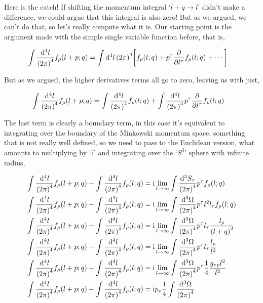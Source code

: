 Here is the catch! If shifting the momentum integral `$l+q\rightarrow l$' didn't make a difference, we could 
argue that this integral is also zero! But as we argued, we can't do that, so let's really compute what it is. 
Our starting point is the argument made with the simple single variable function before, that is,

\begin{align}
    \int\frac{\dd[4]{l}}{\qty(2\pi)^4}f_\rho\qty(l+p;q)&=\int\dd[4]{l}{\qty(2\pi)^4}\qty[f_\rho\qty(l;q)+p^\tau\pdv{}{l^\tau}f_\rho\qty(l;q)+\cdots]\nonumber
\end{align}

But as we argued, the higher derivatives terms all go to zero, leaving us with just,

\begin{align}
    \int\frac{\dd[4]{l}}{\qty(2\pi)^4}f_\rho\qty(l+p;q)&=\int\frac{\dd[4]{l}}{\qty(2\pi)^4}f_\rho\qty(l;q)+\int\frac{\dd[4]{l}}{\qty(2\pi)^4}p^\tau\pdv{}{l^\tau}f_\rho\qty(l;q)\nonumber
\end{align}

The last term is clearly a boundary term, in this case it's equivalent to integrating over the boundary of the 
Minkowski momentum space, something that is not really well defined, so we need to pass to the Euclidean version, 
what amounts to multiplying by `$\textnormal{i}$' and integrating over the `$S^3$' sphere with infinite radius,

\begin{align}
    \int\frac{\dd[4]{l}}{\qty(2\pi)^4}f_\rho\qty(l+p;q)-\int\frac{\dd[4]{l}}{\qty(2\pi)^4}f_\rho\qty(l;q)
    &=\textnormal{i}\lim\limits_{l\rightarrow\infty}\int\frac{\dd[3]{S_\tau}}{\qty(2\pi)^4}p^\tau f_\rho\qty(l;q)\nonumber\\
    \int\frac{\dd[4]{l}}{\qty(2\pi)^4}f_\rho\qty(l+p;q)-\int\frac{\dd[4]{l}}{\qty(2\pi)^4}f_\rho\qty(l;q)
    &=\textnormal{i}\lim\limits_{l\rightarrow\infty}\int\frac{\dd[3]{\Omega}}{\qty(2\pi)^4}p^\tau l^2l_\tau f_\rho\qty(l;q)\nonumber\\
    \int\frac{\dd[4]{l}}{\qty(2\pi)^4}f_\rho\qty(l+p;q)-\int\frac{\dd[4]{l}}{\qty(2\pi)^4}f_\rho\qty(l;q)
    &=\textnormal{i}\lim\limits_{l\rightarrow\infty}\int\frac{\dd[3]{\Omega}}{\qty(2\pi)^4}p^\tau l_\tau \frac{l_\rho}{\qty(l+q)^2}\nonumber\\
    \int\frac{\dd[4]{l}}{\qty(2\pi)^4}f_\rho\qty(l+p;q)-\int\frac{\dd[4]{l}}{\qty(2\pi)^4}f_\rho\qty(l;q)
    &=\textnormal{i}\lim\limits_{l\rightarrow\infty}\int\frac{\dd[3]{\Omega}}{\qty(2\pi)^4}p^\tau l_\tau \frac{l_\rho}{l^2}\nonumber\\
    \int\frac{\dd[4]{l}}{\qty(2\pi)^4}f_\rho\qty(l+p;q)-\int\frac{\dd[4]{l}}{\qty(2\pi)^4}f_\rho\qty(l;q)
    &=\textnormal{i}\lim\limits_{l\rightarrow\infty}\int\frac{\dd[3]{\Omega}}{\qty(2\pi)^4}p^\tau \frac14 \frac{g_{\tau\rho}l^2}{l^2}\nonumber\\
    \int\frac{\dd[4]{l}}{\qty(2\pi)^4}f_\rho\qty(l+p;q)-\int\frac{\dd[4]{l}}{\qty(2\pi)^4}f_\rho\qty(l;q)
    &=\textnormal{i} p_\rho \frac14 \int\frac{\dd[3]{\Omega}}{\qty(2\pi)^4}\nonumber
\end{align}

